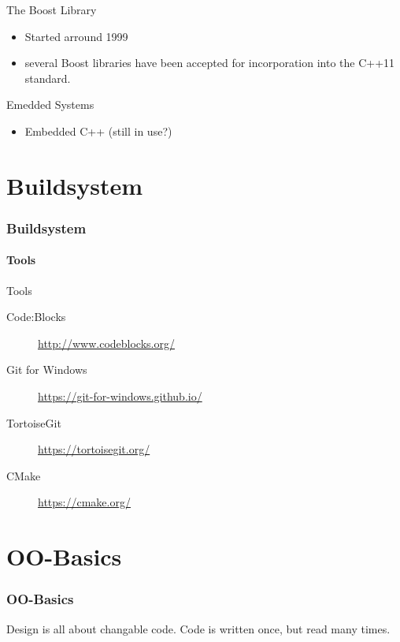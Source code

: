 \documentclass{beamer}
\begin{document}
\begin{frame}{The Boost Library}
\begin{itemize}
  \item Started arround 1999
  \item several Boost libraries have been accepted for incorporation into the
  C++11 standard.
\end{itemize}
\end{frame}

\begin{frame}{Emedded Systems}
\begin{itemize}
  \item Embedded C++ (still in use?)
\end{itemize}
\end{frame}


\part{Buildsystem}

\section{Buildsystem}
\subsection{Tools}
\begin{frame}{Tools}
\begin{description}
  \item[Code:Blocks] \url{http://www.codeblocks.org/}
  \item[Git for Windows] \url{https://git-for-windows.github.io/}
  \item[TortoiseGit] \url{https://tortoisegit.org/}
  \item[CMake] \url{https://cmake.org/}  
\end{description}

\end{frame}

\part{OO-Basics}

\section{OO-Basics}

\begin{frame}
Design is all about changable code.
Code is written once, but read many times.
\end{frame}
\end{document}
